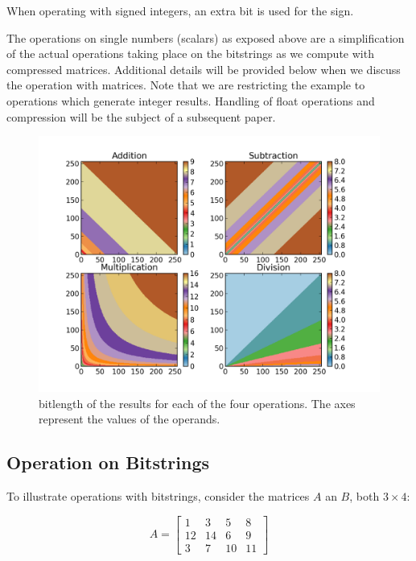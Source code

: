 \documentclass[12pt]{article}
\begin{document}
When operating with signed integers, an extra bit is used for the sign.

The operations on single numbers (scalars) as exposed above are a simplification
of the
actual operations taking place on the bitstrings as we compute with compressed
matrices. Additional details will be provided below when we discuss the
operation with matrices. Note that we are restricting the example to operations
which generate integer results. Handling of float operations and compression
will be the subject of a subsequent paper.

\begin{figure}[h]
 \centering
 \includegraphics[width=12cm]{./bitlength.png}
 \caption{bitlength of the results for each of the four operations. The axes
represent the values of the operands.}
 \label{fig:bitlength}
\end{figure}


\subsection{Operation on Bitstrings}

To illustrate operations with bitstrings, consider the matrices $A$ an $B$,
both $3 \times 4$:



\begin{equation}
	A = \begin{bmatrix}
			1 & 3 & 5 & 8\\ 
			12 &14  & 6 & 9\\ 
			3 & 7 & 10 & 11
		\end{bmatrix}
\end{equation}
\end{document}
